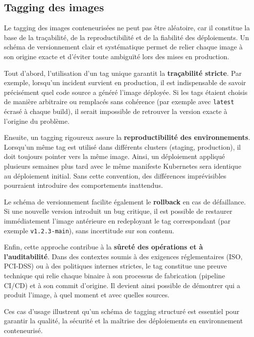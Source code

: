\subsection{Tagging des images}

Le tagging des images conteneurisées ne peut pas être aléatoire, car il constitue la base de la traçabilité, de la reproductibilité et de la fiabilité des déploiements. Un schéma de versionnement clair et systématique permet de relier chaque image à son origine exacte et d'éviter toute ambiguïté lors des mises en production.

Tout d'abord, l'utilisation d'un tag unique garantit la \textbf{traçabilité stricte}. Par exemple, lorsqu'un incident survient en production, il est indispensable de savoir précisément quel code source a généré l'image déployée. Si les tags étaient choisis de manière arbitraire ou remplacés sans cohérence (par exemple avec \texttt{latest} écrasé à chaque build), il serait impossible de retrouver la version exacte à l'origine du problème.

Ensuite, un tagging rigoureux assure la \textbf{reproductibilité des environnements}. Lorsqu'un même tag est utilisé dans différents clusters (staging, production), il doit toujours pointer vers la même image. Ainsi, un déploiement appliqué plusieurs semaines plus tard avec le même manifeste Kubernetes sera identique au déploiement initial. Sans cette convention, des différences imprévisibles pourraient introduire des comportements inattendus.

Le schéma de versionnement facilite également le \textbf{rollback} en cas de défaillance. Si une nouvelle version introduit un bug critique, il est possible de restaurer immédiatement l'image antérieure en redeployant le tag correspondant (par exemple \texttt{v1.2.3-main}), sans incertitude sur son contenu.

Enfin, cette approche contribue à la \textbf{sûreté des opérations et à l'auditabilité}. Dans des contextes soumis à des exigences réglementaires (ISO, PCI-DSS) ou à des politiques internes strictes, le tag constitue une preuve technique qui relie chaque binaire à son processus de fabrication (pipeline CI/CD) et à son commit d'origine. Il devient ainsi possible de démontrer qui a produit l'image, à quel moment et avec quelles sources.

Ces cas d'usage illustrent qu'un schéma de tagging structuré est essentiel pour garantir la qualité, la sécurité et la maîtrise des déploiements en environnement conteneurisé.

